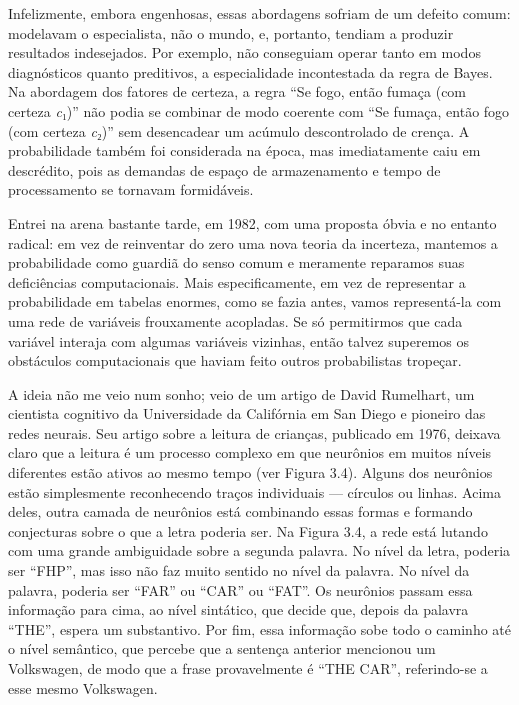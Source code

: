\documentclass[11pt,a5paper,twoside]{book}
\begin{document}
Infelizmente, embora engenhosas, essas abordagens sofriam de um defeito comum: modelavam o especialista, não o mundo, e, portanto, tendiam a produzir resultados indesejados. Por exemplo, não conseguiam operar tanto em modos diagnósticos quanto preditivos, a especialidade incontestada da regra de Bayes. Na abordagem dos fatores de certeza, a regra “Se fogo, então fumaça (com certeza \textit{c}₁)” não podia se combinar de modo coerente com “Se fumaça, então fogo (com certeza \textit{c}₂)” sem desencadear um acúmulo descontrolado de crença. A probabilidade também foi considerada na época, mas imediatamente caiu em descrédito, pois as demandas de espaço de armazenamento e tempo de processamento se tornavam formidáveis.

Entrei na arena bastante tarde, em 1982, com uma proposta óbvia e no entanto radical: em vez de reinventar do zero uma nova teoria da incerteza, mantemos a probabilidade como guardiã do senso comum e meramente reparamos suas deficiências computacionais. Mais especificamente, em vez de representar a probabilidade em tabelas enormes, como se fazia antes, vamos representá-la com uma rede de variáveis frouxamente acopladas. Se só permitirmos que cada variável interaja com algumas variáveis vizinhas, então talvez superemos os obstáculos computacionais que haviam feito outros probabilistas tropeçar.

A ideia não me veio num sonho; veio de um artigo de David Rumelhart, um cientista cognitivo da Universidade da Califórnia em San Diego e pioneiro das redes neurais. Seu artigo sobre a leitura de crianças, publicado em 1976, deixava claro que a leitura é um processo complexo em que neurônios em muitos níveis diferentes estão ativos ao mesmo tempo (ver Figura 3.4). Alguns dos neurônios estão simplesmente reconhecendo traços individuais — círculos ou linhas. Acima deles, outra camada de neurônios está combinando essas formas e formando conjecturas sobre o que a letra poderia ser. Na Figura 3.4, a rede está lutando com uma grande ambiguidade sobre a segunda palavra. No nível da letra, poderia ser “FHP”, mas isso não faz muito sentido no nível da palavra. No nível da palavra, poderia ser “FAR” ou “CAR” ou “FAT”. Os neurônios passam essa informação para cima, ao nível sintático, que decide que, depois da palavra “THE”, espera um substantivo. Por fim, essa informação sobe todo o caminho até o nível semântico, que percebe que a sentença anterior mencionou um Volkswagen, de modo que a frase provavelmente é “THE CAR”, referindo-se a esse mesmo Volkswagen.
\end{document}
